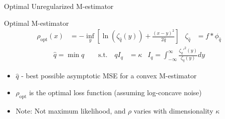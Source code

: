 \documentclass[pdf]{beamer}
\begin{document}
\begin{frame}[t]{Optimal Unregularized M-estimator}



    \vspace{.2in}

    \begin{block}{Optimal M-estimator}
        \begin{align*}
            \rho_{\text{opt}}(x) &= -\inf_y{\left[\ln(\zeta_{\hat{q}}(y))+\frac{(x-y)^2}{2 \hat{q}}\right]} & \zeta_{\hat{q}} &= f*\phi_{\hat{q}}
        \end{align*}
        \begin{align*}
           \hat{q} = \min{q} \quad \quad \text{s.t.} \quad q I_{q} &=\kappa & I_{q} = \int_{-\infty}^{\infty}{\frac{\zeta_{q}'^2(y)}{\zeta_{q}(y)}dy}
        \end{align*}


        \begin{itemize}
        \vspace{.1in}
        \item $\hat{q}$ - best possible asymptotic MSE for a convex M-estimator

        \item $\rho_{\text{opt}}$ is the optimal loss function (assuming log-concave noise)

        \item{Note: Not maximum likelihood, and $\rho$ varies with dimensionality $\kappa$}
        \end{itemize}

    \end{block}

\end{frame}
\end{document}
